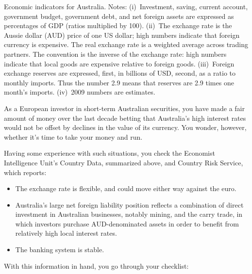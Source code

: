 \documentclass[letterpaper,12pt]{exam}
\begin{document}
\begin{questions}
\begin{center}
{}
\end{center}
{Economic indicators for Australia.
Notes:
(i)~Investment, saving, current account, government budget,
government debt, and net foreign assets
are expressed as percentages of GDP (ratios multiplied by 100).
(ii)~The exchange rate is the Aussie dollar (AUD) price
of one US dollar;
high numbers indicate that foreign currency is expensive.
The real exchange rate is a weighted average across trading partners.
The convention is the inverse of the exchange rate:
high numbers indicate that local goods are expensive relative to foreign
goods.
(iii)~Foreign exchange reserves are expressed, first,
in billions of USD, second,
as a ratio to monthly imports.
Thus the number 2.9 means that reserves are 2.9 times one
month's imports.
(iv)~2009 numbers are estimates.}

As a European investor in short-term Australian securities,
you have made a fair amount of money over the last decade
betting that Australia's high interest rates would not
be offset by declines in the value of its currency.
You wonder, however, whether it's time to take your money
and run.

Having some experience with such situations,
you check the Economist Intelligence Unit's Country Data,
summarized above,
and Country Risk Service,
which reports:
%
\begin{itemize}
\item The exchange rate is flexible, and could move either way against
the euro.
\item Australia's large net foreign liability position reflects
a combination of direct investment in Australian businesses,
notably mining,
and the carry trade,
in which investors purchase AUD-denominated assets
in order to benefit from relatively high local interest rates.
\item The banking system is stable.
\end{itemize}

With this information in hand, you go through your checklist:
%
\end{questions}
\end{document}
